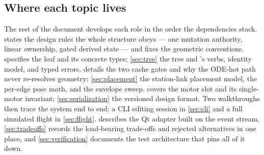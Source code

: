 
\subsection{Where each topic lives}\label{sec:intro-map}

The rest of the document develops each role in the order the dependencies stack.
 states the design rules the whole structure obeys --- one mutation
authority, linear ownership, gated derived state --- and fixes the geometric conventions.
 specifies the  leaf and its concrete types; \cref{sec:tree} the
 tree and 's verbs, identity model, and typed errors.
 details the two cache gates and why the ODE-hot path never re-resolves
geometry; \cref{sec:placement} the station-link placement model, the per-edge pose math, and the
envelope sweep.  covers the motor slot and its single-motor invariant;
\cref{sec:serialization} the versioned  design format. Two walkthroughs then trace the
system end to end: a CLI editing session in \cref{sec:cli} and a full simulated flight in
\cref{sec:flight}.  describes the Qt adapter built on the event stream,
\cref{sec:tradeoffs} records the load-bearing trade-offs and rejected alternatives in one place,
and \cref{sec:verification} documents the test architecture that pins all of it down.
